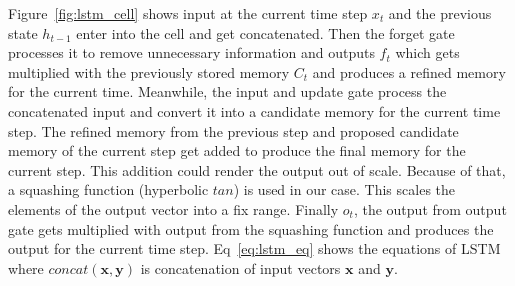 \documentclass[10pt,twocolumn,letterpaper]{article}
\begin{document}
Figure~\ref{fig:lstm_cell} shows input at the current time step $x_t$ and the 
previous state $h_{t-1}$ enter into the cell and get concatenated. Then the forget gate processes it to remove
unnecessary information and outputs $f_t$ which gets multiplied with the previously 
stored memory $C_t$ and produces a refined memory for the current time. Meanwhile, the input 
and  update gate process the concatenated input and convert it into a candidate memory for the current time step. The refined memory from the previous step and proposed candidate memory of the current step get added to produce the final memory for the current step. This addition could render the output out of scale. Because of that, a squashing function (hyperbolic $tan$) is used 
in our case. This scales the elements of the output vector into a fix range. Finally $o_t$, the output 
from output gate gets multiplied with output from the squashing function and produces the output for the current time step. Eq~\ref{eq:lstm_eq} shows the equations of LSTM where $concat(\mathbf{x},\mathbf{y})$ is 
concatenation of input vectors $\mathbf{x}$ and $\mathbf{y}$.
\end{document}

